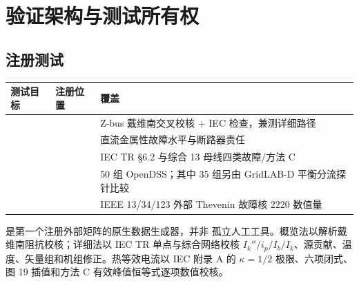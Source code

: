 \section{验证架构与测试所有权}\label{sec:sc-verify}

\subsection{注册测试}
\begin{center}\footnotesize
\begin{tabular}{@{}L{5.4cm}L{3.8cm}L{5.4cm}@{}}
\toprule
测试目标 & 注册位置 & 覆盖\\
\midrule
{} &  & Z-bus 戴维南交叉校核 + IEC 检查，兼测详细路径\\
 &  & 直流金属性故障水平与断路器责任\\
 &  & IEC TR §6.2 与综合 13 母线四类故障/方法 C\\
 &  & 50 组 OpenDSS；其中 35 组另由 GridLAB-D 平衡分流探针比较\\
 &  & IEEE 13/34/123 外部 Thevenin 故障核 2220 数值量\\
\bottomrule
\end{tabular}
\end{center}
 是第一个注册外部矩阵的原生数据生成器，并非
孤立人工工具。概览法以解析戴维南阻抗校核；详细法以 IEC TR 单点与综合网络校核
$I_k''/i_p/I_b/I_k$、源贡献、温度、矢量组和机组修正。热等效电流以 IEC 附录 A 的
$\kappa=1/2$ 极限、六项闭式、图 19 插值和方法 C 有效峰值恒等式逐项数值校核。

